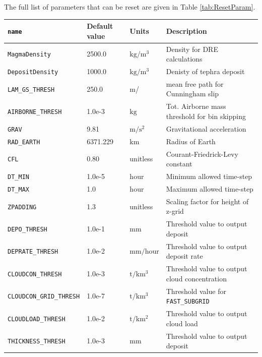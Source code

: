 The full list of parameters that can be reset are given in Table \ref{tab:ResetParam}.
\small
\begin{table}[htbp]
\begin{center}
\begin{tabular}{| l | l | l | l |}
\hline
\texttt{name} & Default value & Units & Description \\
\hline
\texttt{MagmaDensity}      & 2500.0   & $\mathrm{kg/m^3}$  &  Density for DRE calculations \\
\texttt{DepositDensity}    & 1000.0   & $\mathrm{kg/m^3}$  &  Denisty of tephra deposit \\
\texttt{LAM\_GS\_THRESH}   & 250.0    & $\mathrm{m}$/      &  mean free path for Cunningham slip \\
\texttt{AIRBORNE\_THRESH}  & 1.0e-3   & $\mathrm{kg}$      &  Tot. Airborne mass threshold for bin skipping \\
\texttt{GRAV}              & 9.81     & $\mathrm{m/s^2}$   &  Gravitational acceleration \\
\texttt{RAD\_EARTH}        & 6371.229 & $\mathrm{km}$      &  Radius of Earth \\
\texttt{CFL}               & 0.80     & unitless           &  Courant-Friedrick-Levy constant \\
\texttt{DT\_MIN}           & 1.0e-5   & $\mathrm{hour}$    &  Minimum allowed time-step \\
\texttt{DT\_MAX}           & 1.0      & $\mathrm{hour}$    &  Maximum allowed time-step \\
\texttt{ZPADDING}          & 1.3      & unitless           &  Scaling factor for height of z-grid \\
\texttt{DEPO\_THRESH}      & 1.0e-1   & $\mathrm{mm}$      &  Threshold value to output deposit \\
\texttt{DEPRATE\_THRESH}   & 1.0e-2   & $\mathrm{mm/hour}$ &  Threshold value to output deposit rate \\
\texttt{CLOUDCON\_THRESH}  & 1.0e-3   & $\mathrm{t/km^3}$  &  Threshold value to output cloud concentration \\
\texttt{CLOUDCON\_GRID\_THRESH}&1.0e-7& $\mathrm{t/km^3}$  &  Threshold value for \texttt{FAST\_SUBGRID} \\
\texttt{CLOUDLOAD\_THRESH} & 1.0e-2   & $\mathrm{t/km^2}$  &  Threshold value to output cloud load \\
\texttt{THICKNESS\_THRESH} & 1.0e-3   & $\mathrm{mm}$      &  Threshold value to output deposit \\

\end{tabular}
\end{center}
\end{table}
